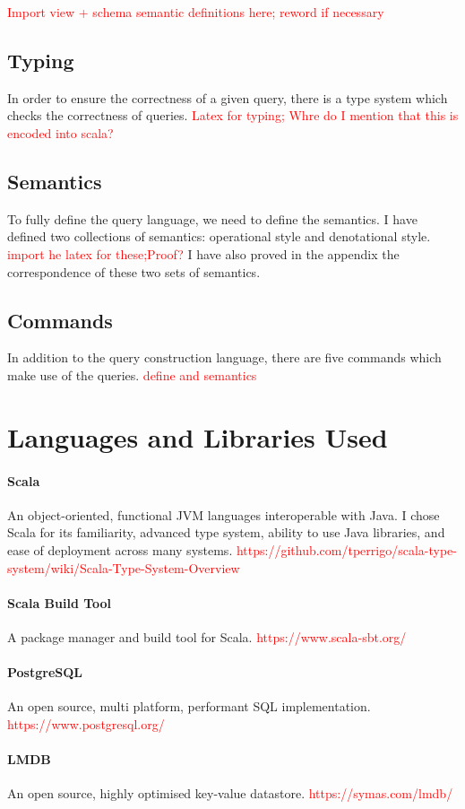 \documentclass[12pt,a4paper,twoside,openright]{report}
\newcommand\todo[1]{\textcolor{red}{#1}}
\begin{document}
\todo{Import view + schema semantic definitions here; reword if necessary}

\subsection{Typing}
In order to ensure the correctness of a given query, there is a type system which checks the correctness of queries. \todo{Latex for typing;} \todo{Whre do I mention that this is encoded into scala?}
\subsection{Semantics}
    To fully define the query language, we need to define the semantics. I have defined two collections of semantics: operational style and denotational style. \todo{import he latex for these;}\todo{Proof?} I have also proved in the appendix the correspondence of these two sets of semantics.
\subsection{Commands}
In addition to the query construction language, there are five commands which make use of the queries. \todo{define and semantics}


\section{Languages and Libraries Used}
\paragraph{Scala} An object-oriented, functional JVM languages interoperable with Java. I chose Scala for its familiarity, advanced type system, ability to use Java libraries, and ease of deployment across many systems. \todo{https://github.com/tperrigo/scala-type-system/wiki/Scala-Type-System-Overview}

\paragraph{Scala Build Tool} A package manager and build tool for Scala.
\todo{https://www.scala-sbt.org/}
\paragraph{PostgreSQL}  An open source, multi platform, performant SQL implementation.
\todo{https://www.postgresql.org/}
\paragraph{LMDB} An open source, highly optimised key-value datastore.
\todo{https://symas.com/lmdb/}
\end{document}
